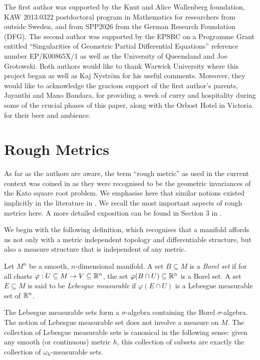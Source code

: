 \documentclass[a4paper, 12pt]{amsart}
\begin{document}
The first author was supported by the Knut and Alice Wallenberg foundation, KAW 2013.0322 
postdoctoral program in Mathematics for researchers from outside Sweden, and from  SPP2026 
from the German Research Foundation (DFG).
The second author was 
supported by the  EPSRC on a Programme Grant entitled ``Singularities of Geometric Partial Differential Equations'' 
reference number EP/K00865X/1 as well as the University of Queensland and Joe Grotowski.
Both authors would like to thank Warwick University where this project began as
well as Kaj Nyström for his useful comments.
Moreover, they would like to acknowledge the gracious support of the first author's 
parents, Jayanthi and Mano Bandara, for providing a week of curry and hospitality during some of the crucial 
phases of this paper, along with the Orbost Hotel in Victoria for their beer and ambience. 

\section{Rough Metrics}
\label{sec:rough_metrics}

As far as the authors are aware, the term ``rough metric'' as used in the current context 
was coined in \cite{BRough} as they were 
recognised to be the geometric invariances of the Kato square root problem.
We emphasise here that similar notions existed implicitly in the 
literature  in \cite{Norris,SC}.
We recall the most important aspects of rough metrics here. 
A more detailed exposition can be found in Section 3 in \cite{BRough}.

We begin with the following definition, which recognises
that a manifold affords us not only with a metric independent 
topology and differentiable structure, but also a measure
structure that is independent of any metric.

\begin{defn}
\label{defn:borel_lebesgue}
Let \(M^n\) be a smooth, \(n\)-dimensional manifold. A set \(B \subseteq M\) is a \emph{Borel set} if for all charts \(\varphi : U \subseteq M \to V \subseteq \mathbb{R}^n\), the set \(\varphi(B \cap U) \subseteq \mathbb{R}^n\) is a Borel set. A set \(E \subseteq M\) is said to be \emph{Lebesgue measurable} if \(\varphi(E \cap U)\) is a Lebesgue measurable set of \(\mathbb{R}^n\).
\end{defn}

\begin{rem}
The Lebesgue measurable sets form a \(\sigma\)-algebra containing the Borel \(\sigma\)-algebra. The notion of Lebesgue measurable set does not involve a measure on \(M\). The collection of Lebesgue measurable sets is canonical in the following sense: given any smooth (or continuous) metric $h$, this collection of subsets are exactly the collection of $\omega_h$-measurable sets.
\end{rem}
\end{document}

